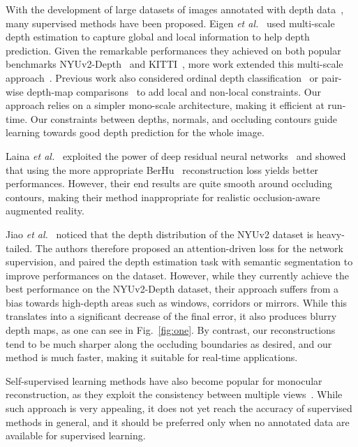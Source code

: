 \documentclass[10pt,twocolumn,letterpaper]{article}
\begin{document}
With   the   development   of large  datasets  of   images   annotated   with   
depth data~\cite{Nyuv2,Geiger2013IJRR,Sun-rgbd,Zhang2016pbrs,Matterport3D, 
McCormacSceneNetRGBD}, many supervised methods have been   proposed. Eigen 
\textit{et al.}~\cite{Eigen14,Eigen2015PredictingDS} used multi-scale depth 
estimation to capture global and local information to help depth prediction. 
Given the remarkable performances they achieved on both popular benchmarks 
NYUv2-Depth~\cite{Nyuv2} and KITTI~\cite{Geiger2013IJRR}, more work extended 
this multi-scale approach~\cite{LiICCV17,xu2017MS-CRF}.   Previous work also   
considered ordinal depth classification~\cite{FuCVPR18-DORN}     
or pair-wise depth-map comparisons~\cite{Cao2018MonocularDE} to add local and 
non-local  constraints. Our approach  relies on a simpler  mono-scale 
architecture,  making it efficient at run-time. Our constraints between depths, 
normals, and occluding contours guide learning towards good depth prediction 
for the whole image.

Laina \textit{et al.}~\cite{Laina2016DeeperDP} exploited the power of deep 
residual neural networks~\cite{He2016ResNet} and showed that using 
the more appropriate BerHu~\cite{BerHuOwen,BerHuZwald} reconstruction loss 
yields better performances. However, their end results are quite smooth around 
occluding contours, making their method inappropriate for realistic 
occlusion-aware augmented reality. 

Jiao \textit{et al.}~\cite{Jiao2018LookDI} noticed that the depth distribution 
of  the NYUv2 dataset is heavy-tailed. The authors therefore proposed an 
attention-driven  loss for the  network supervision,  and  paired the depth  
estimation  task with  semantic segmentation  to  improve performances  on  
the  dataset.  However, while they currently achieve the  best  performance 
on  the  NYUv2-Depth  dataset,  their approach suffers from a bias towards 
high-depth areas such as windows, corridors or mirrors. While this translates 
into a significant decrease of the final error, it also produces blurry    
depth maps, as one can see in Fig.~\ref{fig:one}.  By contrast, our 
reconstructions tend to be much sharper along the occluding boundaries as 
desired, and our method is much faster, making it suitable for real-time 
applications. 

Self-supervised learning methods have also become popular for monocular 
reconstruction, as they exploit the consistency between multiple 
views~\cite{monodepth17,XieDeep3D,PoggiTrinocular,Yang2018UnsupervisedLO, 
Yin2018UnsupervisedGeoNet, TengOcclusionAware2018}.  While such approach is
very appealing, it does not yet reach the accuracy of supervised methods in
general, and it should be preferred only when no annotated data are available 
for supervised learning.
\end{document}
